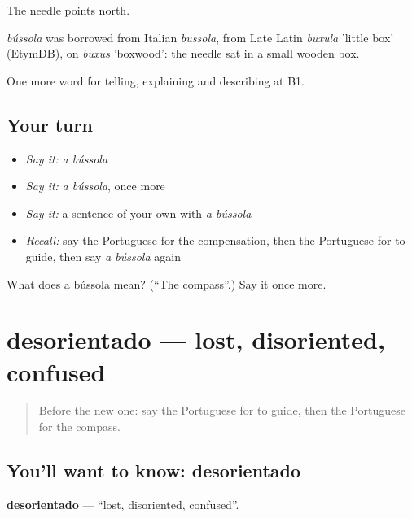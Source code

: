The needle points north.

\begin{cousinweb}
\emph{bússola} was borrowed from Italian \emph{bussola}, from Late Latin \emph{buxula} 'little box' (EtymDB), on \emph{buxus} 'boxwood': the needle sat in a small wooden box.
\end{cousinweb}

\begin{grammarlens}[title={What you've built}]
One more word for telling, explaining and describing at B1.
\end{grammarlens}

\subsection*{Your turn}
\begin{itemize}
\raggedright
  \item \emph{Say it:} \emph{a bússola}
  \item \emph{Say it:} \emph{a bússola}, once more
  \item \emph{Say it:} a sentence of your own with \emph{a bússola}
  \item \emph{Recall:} say the Portuguese for the compensation, then the Portuguese for to guide, then say \emph{a bússola} again
\end{itemize}

\begin{tcolorbox}[breakable,colback=teal!4,colframe=teal!35!black,title={Before you move on}]
What does a bússola mean? (\textquotedblleft{}The compass\textquotedblright{}.) Say it once more.
\end{tcolorbox}
\section[desorientado]{desorientado — lost, disoriented, confused}

\label{lesson:PT-C435-desorientado}



\begin{quote}
Before the new one: say the Portuguese for to guide, then the Portuguese for the compass.
\end{quote}

\subsection*{You'll want to know: desorientado}
\textbf{desorientado} — \textquotedblleft{}lost, disoriented, confused\textquotedblright{}.

